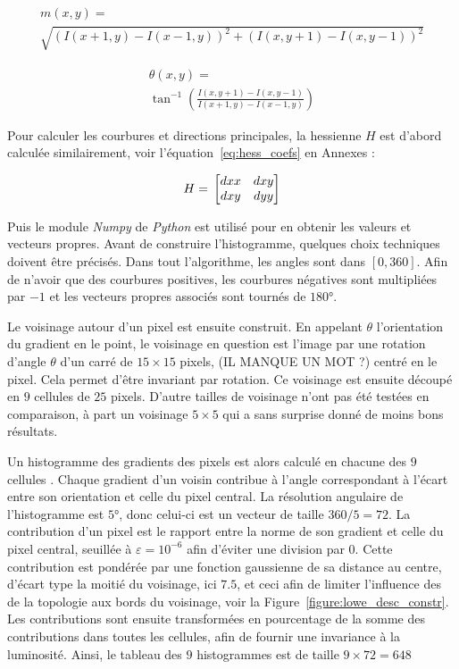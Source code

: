 \documentclass[
	a4paper, %
	10pt, %
	unnumberedsections, %
	twoside, %
]{LTJournalArticle}
\begin{document}
\begin{multline}
	m(x, y) = \\
	\sqrt{(I(x+1, y) - I(x-1,y))^2 + (I(x,y+1)-I(x,y-1))^2}
\end{multline}

\begin{multline} \label{eq:angle_grad}
	\theta(x, y) = \\
	\tan^{-1}\left(\frac{I(x,y+1)-I(x,y-1)}{I(x+1, y) - I(x-1,y)}\right)
\end{multline}

Pour calculer les courbures et directions principales, la hessienne $H$ est d'abord calculée
similairement, voir l'équation~\ref{eq:hess_coefs} en Annexes :

\begin{equation}
	H = \\
	\begin{bmatrix}
		dxx & dxy \\
		dxy & dyy
	\end{bmatrix}
\end{equation}

Puis le module \textit{Numpy} de \textit{Python} est utilisé pour en obtenir les valeurs et vecteurs
propres.
Avant de construire l'histogramme, quelques choix techniques doivent être précisés.
Dans tout l'algorithme, les angles sont dans $[0, 360]$. Afin de n'avoir que des
courbures positives, les courbures négatives sont multipliées par $-1$
et les vecteurs propres associés sont tournés de $180$°.

Le voisinage autour d'un pixel est ensuite construit. En appelant $\theta$
l'orientation du gradient en le point, le voisinage en question est l'image par
une rotation d'angle $\theta$ d'un carré de $15\times 15$ pixels, (IL MANQUE UN MOT ?)
centré en le pixel. Cela permet d'être invariant par rotation.
Ce voisinage est ensuite découpé en $9$ cellules de $25$ pixels.
D'autre tailles de voisinage n'ont pas été testées en comparaison, à
part un voisinage $5 \times 5$ qui a sans surprise donné de moins bons résultats.

Un histogramme des gradients des pixels est alors calculé en chacune des $9$ cellules .
Chaque gradient d'un voisin contribue à
l'angle correspondant à l'écart entre son orientation et celle du pixel central.
La résolution angulaire de l'histogramme est $5$°, donc celui-ci est un vecteur de taille
$360 / 5 = 72$.
La contribution d'un pixel
est le rapport entre la norme de son gradient et celle du pixel central,
seuillée à $\varepsilon = 10^{-6}$ afin d'éviter une division par $0$.
Cette contribution est pondérée par une fonction gaussienne de sa distance au centre,
d'écart type la moitié du voisinage, ici $7.5$, et ceci afin de limiter l'influence des
de la topologie aux bords du voisinage, voir la Figure~\ref{figure:lowe_desc_constr}.
Les contributions sont ensuite transformées en pourcentage
de la somme des contributions dans toutes les cellules, afin de fournir une invariance
à la luminosité. Ainsi, le tableau des $9$ histogrammes est de taille $9 \times 72 = 648$
\end{document}
